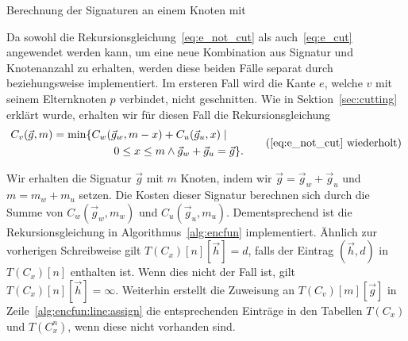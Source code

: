 \begin{algorithm}
    \caption{Berechnung der Signaturen an einem Knoten mit \canfun{}}\label{alg:canfun}
    \begin{algorithmic}[1]
                        \State {}
                        \State {}
                    \EndFor
                \EndFor
            \EndFor
        \EndFor
        \EndFunction
    \end{algorithmic}
\end{algorithm}

\newcommand{\encfun}{\textproc{edge\_not\_cut}}
\newcommand{\ecfun}{\textproc{edge\_cut}}

Da sowohl die Rekursionsgleichung~\eqref{eq:e_not_cut} als auch~\eqref{eq:e_cut} angewendet werden kann, um eine neue Kombination aus Signatur und Knotenanzahl zu erhalten, werden diese beiden Fälle separat durch \encfun{} beziehungsweise \ecfun{} implementiert.
Im ersteren Fall wird die Kante $e$, welche $v$ mit seinem Elternknoten $p$ verbindet, nicht geschnitten.
Wie in Sektion~\ref{sec:cutting} erklärt wurde, erhalten wir für diesen Fall die Rekursionsgleichung
\begin{equation*}
    \begin{aligned}
        C_v(\vec{g}, m) = \min \{ & C_w(\vec{g}_w, m - x) + C_u(\vec{g}_u, x) \mid \\
        & \qquad 0 \leq x \leq m \land \vec{g}_w + \vec{g}_u = \vec{g} \}.
    \end{aligned}
    \tag{\ref{eq:e_not_cut} wiederholt}
\end{equation*}

Wir erhalten die Signatur $\vec{g}$ mit $m$ Knoten, indem wir $\vec{g} = \vec{g}_w + \vec{g}_u$ und $m = m_w + m_u$ setzen.
Die Kosten dieser Signatur berechnen sich durch die Summe von $C_w(\vec{g}_w, m_w)$ und $C_u(\vec{g}_u, m_u)$.
Dementsprechend ist die Rekursionsgleichung in Algorithmus~\ref{alg:encfun} implementiert.
Ähnlich zur vorherigen Schreibweise gilt $T(C_x)[n][\vec{h}] = d$, falls der Eintrag $(\vec{h}, d)$ in $T(C_x)[n]$ enthalten ist.
Wenn dies nicht der Fall ist, gilt $T(C_x)[n][\vec{h}] = \infty$.
Weiterhin erstellt die Zuweisung an $T(C_v)[m][\vec{g}]$ in Zeile~\ref{alg:encfun:line:assign} die entsprechenden Einträge in den Tabellen $T(C_x)$ und $T(C_x^n)$, wenn diese nicht vorhanden sind.

